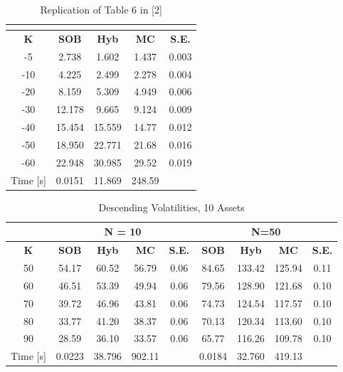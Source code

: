 \documentclass[a4paper]{article}
\begin{document}
\begin {table}[H]
\caption {Replication of Table 6 in [2]} 
\begin{center}
\begin{tabular}{c|c c c c}
\hline
\multicolumn{1}{c|}{} & \multicolumn{4}{|c}{} \\ 
\hline
  \textbf{K} & \textbf{SOB} & \textbf{Hyb} & \textbf{MC} & \textbf{S.E.}\\
  -5 & 2.738	& 1.602	& 1.437    &  0.003\\
-10 & 4.225	& 2.499	& 2.278    &	0.004\\
-20 & 8.159	& 5.309	& 4.949    & 0.006\\
-30 & 12.178	& 9.665	& 9.124& 0.009\\
-40 & 15.454	& 15.559	& 14.77 & 0.012\\
-50 & 18.950	& 22.771	& 21.68 & 0.016\\
-60 & 22.948	& 30.985	& 29.52 & 0.019\\
\hline
Time [s] & 0.0151 & 11.869 & 248.59 & \\
\hline
\end{tabular}
\end{center}
\end{table}

\begin {table}[H]
\caption {Descending Volatilities, 10 Assets} 
\begin{center}
\begin{tabular}{c|c c c c|c c c c}
\hline
\multicolumn{1}{c|}{} & \multicolumn{4}{|c|}{N = 10} & \multicolumn{4}{|c}{N=50} \\ 
\hline
  \textbf{K} & \textbf{SOB} & \textbf{Hyb} & \textbf{MC} & \textbf{S.E.} & \textbf{SOB} & \textbf{Hyb} & \textbf{MC} & \textbf{S.E.}\\
50 &	54.17& 60.52 	& 56.79 & 0.06 & 84.65 & 133.42 & 125.94 & 0.11 \\
60 & 46.51	& 53.39 	& 49.94 & 0.06   & 79.56  & 128.90 & 121.68 & 0.10  \\
70 & 39.72	& 46.96	& 43.81 & 0.06  & 74.73 & 124.54 & 117.57 & 0.10\\
80 & 33.77	& 41.20 	& 38.37 & 0.06  & 70.13  & 120.34 & 113.60 & 0.10  \\
90 & 28.59& 36.10	& 33.57  & 0.06  & 65.77 & 116.26 & 109.78 &0.10\\
\hline
Time [s] & 0.0223 & 38.796 & 902.11 & & 0.0184 & 32.760 & 419.13 \\
\hline
\end{tabular}
\end{center}
\end{table}
\end{document}
